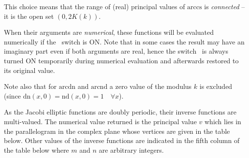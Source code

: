 This choice means that the range of (real) principal values of
$\mathrm{arccs}$ is \emph{connected} -- it is the open set $(0, 2K(k))$.

When their arguments are \emph{numerical}, these functions will be
evaluated numerically if the \ switch is  ON.
Note that in some cases the result may have an imaginary
part even if both arguments are real, hence the switch
\ is always turned ON temporarily during numerical evaluation and
afterwards restored to its original value.

Note also that for $\mathrm{arcdn}$ and $\mathrm{arcnd}$ a zero value of
the modulus $k$ is excluded (since
$\mathrm{dn}(x,0) = \mathrm{nd}(x,0) = 1 \quad \forall x$).

As the Jacobi elliptic functions are doubly periodic, their inverse functions
are multi-valued. The numerical value returned is the principal value $v$ which
lies in the parallelogram in the complex plane whose vertices are given in the
table below. Other values of the inverse functions are indicated in the
fifth column of the table below where $m$ and $n$ are arbitrary integers.

